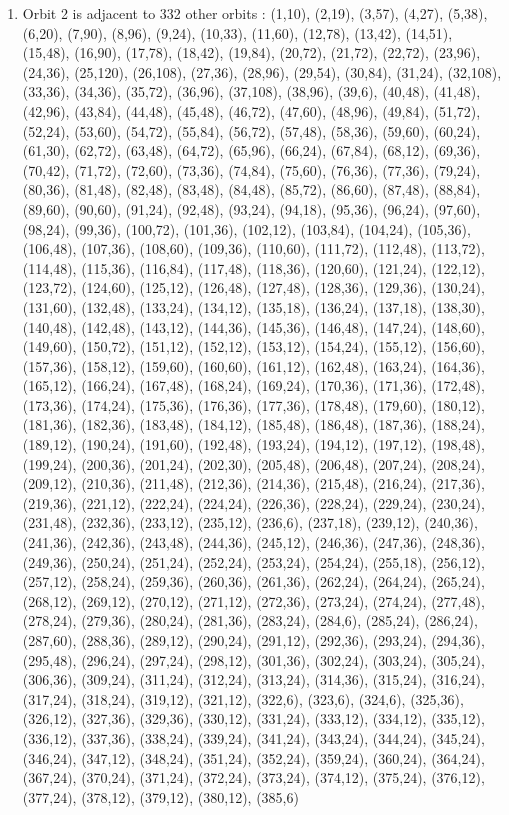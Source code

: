 \documentclass[12pt]{article}
\begin{document}
\begin{enumerate}
\item Orbit 2 is adjacent to 332 other orbits : (1,10), (2,19), (3,57), (4,27), (5,38), (6,20), (7,90), (8,96), (9,24), (10,33), (11,60), (12,78), (13,42), (14,51), (15,48), (16,90), (17,78), (18,42), (19,84), (20,72), (21,72), (22,72), (23,96), (24,36), (25,120), (26,108), (27,36), (28,96), (29,54), (30,84), (31,24), (32,108), (33,36), (34,36), (35,72), (36,96), (37,108), (38,96), (39,6), (40,48), (41,48), (42,96), (43,84), (44,48), (45,48), (46,72), (47,60), (48,96), (49,84), (51,72), (52,24), (53,60), (54,72), (55,84), (56,72), (57,48), (58,36), (59,60), (60,24), (61,30), (62,72), (63,48), (64,72), (65,96), (66,24), (67,84), (68,12), (69,36), (70,42), (71,72), (72,60), (73,36), (74,84), (75,60), (76,36), (77,36), (79,24), (80,36), (81,48), (82,48), (83,48), (84,48), (85,72), (86,60), (87,48), (88,84), (89,60), (90,60), (91,24), (92,48), (93,24), (94,18), (95,36), (96,24), (97,60), (98,24), (99,36), (100,72), (101,36), (102,12), (103,84), (104,24), (105,36), (106,48), (107,36), (108,60), (109,36), (110,60), (111,72), (112,48), (113,72), (114,48), (115,36), (116,84), (117,48), (118,36), (120,60), (121,24), (122,12), (123,72), (124,60), (125,12), (126,48), (127,48), (128,36), (129,36), (130,24), (131,60), (132,48), (133,24), (134,12), (135,18), (136,24), (137,18), (138,30), (140,48), (142,48), (143,12), (144,36), (145,36), (146,48), (147,24), (148,60), (149,60), (150,72), (151,12), (152,12), (153,12), (154,24), (155,12), (156,60), (157,36), (158,12), (159,60), (160,60), (161,12), (162,48), (163,24), (164,36), (165,12), (166,24), (167,48), (168,24), (169,24), (170,36), (171,36), (172,48), (173,36), (174,24), (175,36), (176,36), (177,36), (178,48), (179,60), (180,12), (181,36), (182,36), (183,48), (184,12), (185,48), (186,48), (187,36), (188,24), (189,12), (190,24), (191,60), (192,48), (193,24), (194,12), (197,12), (198,48), (199,24), (200,36), (201,24), (202,30), (205,48), (206,48), (207,24), (208,24), (209,12), (210,36), (211,48), (212,36), (214,36), (215,48), (216,24), (217,36), (219,36), (221,12), (222,24), (224,24), (226,36), (228,24), (229,24), (230,24), (231,48), (232,36), (233,12), (235,12), (236,6), (237,18), (239,12), (240,36), (241,36), (242,36), (243,48), (244,36), (245,12), (246,36), (247,36), (248,36), (249,36), (250,24), (251,24), (252,24), (253,24), (254,24), (255,18), (256,12), (257,12), (258,24), (259,36), (260,36), (261,36), (262,24), (264,24), (265,24), (268,12), (269,12), (270,12), (271,12), (272,36), (273,24), (274,24), (277,48), (278,24), (279,36), (280,24), (281,36), (283,24), (284,6), (285,24), (286,24), (287,60), (288,36), (289,12), (290,24), (291,12), (292,36), (293,24), (294,36), (295,48), (296,24), (297,24), (298,12), (301,36), (302,24), (303,24), (305,24), (306,36), (309,24), (311,24), (312,24), (313,24), (314,36), (315,24), (316,24), (317,24), (318,24), (319,12), (321,12), (322,6), (323,6), (324,6), (325,36), (326,12), (327,36), (329,36), (330,12), (331,24), (333,12), (334,12), (335,12), (336,12), (337,36), (338,24), (339,24), (341,24), (343,24), (344,24), (345,24), (346,24), (347,12), (348,24), (351,24), (352,24), (359,24), (360,24), (364,24), (367,24), (370,24), (371,24), (372,24), (373,24), (374,12), (375,24), (376,12), (377,24), (378,12), (379,12), (380,12), (385,6)

\end{enumerate}
\end{document}
